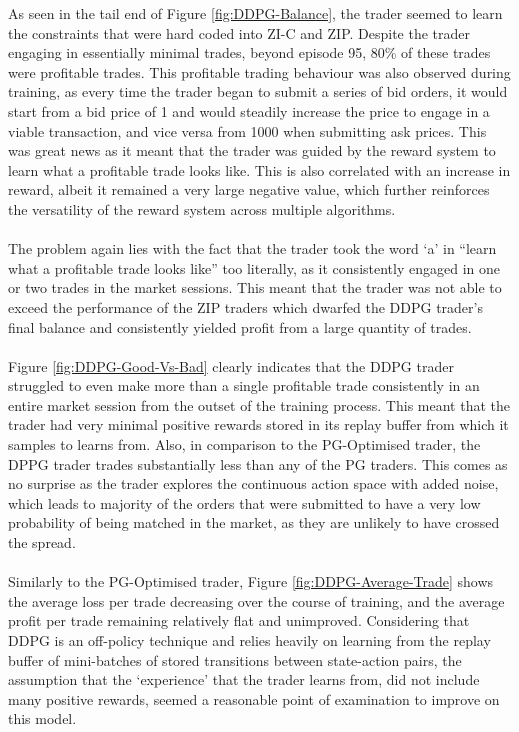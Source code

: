 \documentclass[ %
                    author={Ashwinder Khurana},
                supervisor={Prof Dave Cliff},
                    degree={MEng},
                     title={The Deeply Reinforced Trader},
                  subtitle={},
                      type={enterprise},
                      year={2020} ]{dissertation}
\begin{document}
{\noindent
As seen in the tail end of Figure \ref{fig:DDPG-Balance}, the trader seemed to learn the constraints that were hard coded into ZI-C and ZIP. Despite the trader engaging in essentially minimal trades, beyond episode 95,  80\% of these trades were profitable trades. This profitable trading behaviour was also observed during training, as every time the trader began to submit a series of bid orders, it would start from a bid price of 1 and would steadily increase the price to engage in a viable transaction, and vice versa from 1000 when submitting ask prices. This was great news as it meant that the trader was guided by the reward system to learn what a profitable trade looks like. This is also correlated with an increase in reward, albeit it remained a very large negative value, which further reinforces the versatility of the reward system across multiple algorithms.
\\
\\
The problem again lies with the fact that the trader took the word \enquote*{a} in \enquote{learn what a profitable trade looks like} too literally, as it consistently engaged in one or two trades in the market sessions. This meant that the trader was not able to exceed the performance of the ZIP traders which dwarfed the DDPG trader's final balance and consistently yielded profit from a large quantity of trades.
\\
\\
Figure \ref{fig:DDPG-Good-Vs-Bad} clearly indicates that the DDPG trader struggled to even make more than a single profitable trade consistently in an entire market session from the outset of the training process. This meant that the trader had very minimal positive rewards stored in its replay buffer from which it samples to learns from. Also, in comparison to the PG-Optimised trader, the DPPG trader trades substantially less than any of the PG traders. This comes as no surprise as the trader explores the continuous action space with added noise, which leads to majority of the orders that were submitted to have a very low probability of being matched in the market, as they are unlikely to have crossed the spread. 
\\
\\
Similarly to the PG-Optimised trader, Figure \ref{fig:DDPG-Average-Trade} shows the average loss per trade decreasing over the course of training, and the average profit per trade remaining relatively flat and unimproved. Considering that DDPG is an off-policy technique and relies heavily on learning from the replay buffer of mini-batches of stored transitions between state-action pairs, the assumption that the \enquote*{experience} that the trader learns from, did not include many positive rewards, seemed a reasonable point of examination to improve on this model.  
}
\end{document}
